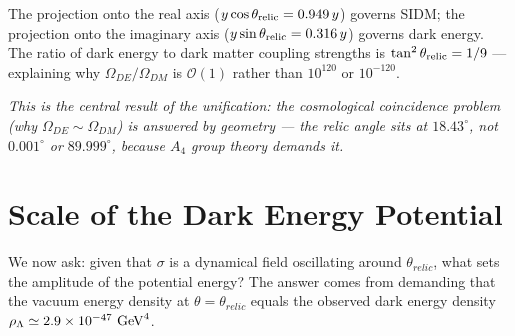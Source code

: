 \begin{center}
\end{center}

The projection onto the real axis ($y\cos\theta_{\rm relic} = 0.949\,y$) governs
SIDM; the projection onto the imaginary axis ($y\sin\theta_{\rm relic} = 0.316\,y$)
governs dark energy. The ratio of dark energy to dark matter coupling strengths
is $\tan^2\theta_{\rm relic} = 1/9$ --- explaining why $\Omega_{DE}/\Omega_{DM}$
is $\mathcal{O}(1)$ rather than $10^{120}$ or $10^{-120}$.

\textit{This is the central result of the unification: the cosmological
coincidence problem (why $\Omega_{DE} \sim \Omega_{DM}$) is answered by
geometry --- the relic angle sits at $18.43^\circ$, not $0.001^\circ$ or
$89.999^\circ$, because $A_4$ group theory demands it.}

\section{Scale of the Dark Energy Potential}
\label{ch3:scale}

We now ask: given that $\sigma$ is a dynamical field oscillating around
$\theta_{relic}$, what sets the amplitude of the potential energy?
The answer comes from demanding that the vacuum energy density at
$\theta = \theta_{relic}$ equals the observed dark energy density
$\rho_\Lambda \simeq 2.9 \times 10^{-47}~{\rm GeV}^4$.


